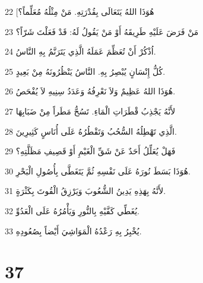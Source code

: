 \par 22 [هُوَذَا اللهُ يَتَعَالَى بِقُدْرَتِهِ. مَنْ مِثْلُهُ مُعَلِّماً؟
\par 23 مَنْ فَرَضَ عَلَيْهِ طَرِيقَهُ أَوْ مَنْ يَقُولُ لَهُ: قَدْ فَعَلْتَ شَرّاً؟
\par 24 اُذْكُرْ أَنْ تُعَظِّمَ عَمَلَهُ الَّذِي يَتَرَنَّمُ بِهِ النَّاسُ.
\par 25 كُلُّ إِنْسَانٍ يُبْصِرُ بِهِ. النَّاسُ يَنْظُرُونَهُ مِنْ بَعِيدٍ.
\par 26 هُوَذَا اللهُ عَظِيمٌ وَلاَ نَعْرِفُهُ وَعَدَدُ سِنِيهِ لاَ يُفْحَصُ.
\par 27 لأَنَّهُ يَجْذِبُ قْطَرَاتِ الْمَاءِ. تَسُحُّ مَطَراً مِنْ ضَبَابِهَا
\par 28 الَّذِي تَهْطِلُهُ السُّحُبُ وَتَقْطُرُهُ عَلَى أُنَاسٍ كَثِيرِينَ.
\par 29 فَهَلْ يُعَلِّلُ أَحَدٌ عَنْ شَقِّ الْغَيْمِ أَوْ قَصِيفِ مَظَلَّتِهِ؟
\par 30 هُوَذَا بَسَطَ نُورَهُ عَلَى نَفْسِهِ ثُمَّ يَتَغَطَّى بِأُصُولِ الْبَحْرِ.
\par 31 لأَنَّهُ بِهَذِهِ يَدِينُ الشُّعُوبَ وَيَرْزِقُ الْقُوتَ بِكَثْرَةٍ.
\par 32 يُغَطِّي كَفَّيْهِ بِالنُّورِ وَيَأْمُرُهُ عَلَى الْعَدُوِّ.
\par 33 يُخْبِرُ بِهِ رَعْدُهُ الْمَوَاشِيَ أَيْضاً بِصُعُودِهِ.

\chapter{37}


